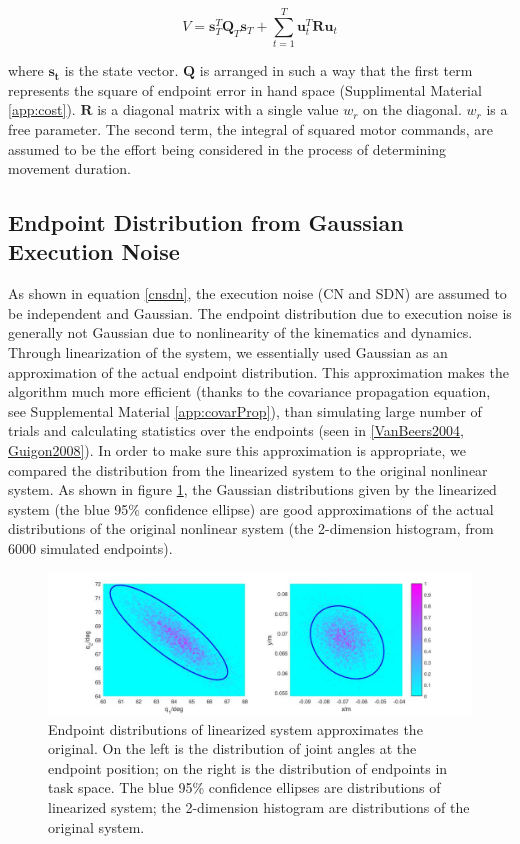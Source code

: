 \begin{equation}\label{eqn:cost}
V = \bm{s}_T^T\bm{Q}_T\bm{s}_T + \sum_{t=1}^T\bm{u}_t^T\bm{Ru}_t
\end{equation}

where $\bm{s_t}$ is the state vector. 
$\bm{Q}$ is arranged in such a way that the first term represents the square of endpoint error in hand space (Supplimental Material \ref{app:cost}). 
$\bm{R}$ is a diagonal matrix with a single value $w_r$ on the diagonal.
$w_r$ is a free parameter.
The second term, the integral of squared motor commands, are assumed to be the effort being considered in the process of determining movement duration. 

\subsection{Endpoint Distribution from Gaussian Execution Noise}

As shown in equation \ref{cnsdn}, the execution noise (CN and SDN) are assumed to be independent and Gaussian. 
The endpoint distribution due to execution noise is generally not Gaussian due to nonlinearity of the kinematics and dynamics. 
Through linearization of the system, we essentially used Gaussian as an approximation of the actual endpoint distribution. 
This approximation makes the algorithm much more efficient (thanks to the covariance propagation equation, see Supplemental Material \ref{app:covarProp}), than simulating large number of trials and calculating statistics over the endpoints (seen in \ref{VanBeers2004, Guigon2008}).
In order to make sure this approximation is appropriate, we compared the distribution from the linearized system to the original nonlinear system. As shown in figure \ref{fig:linearizeddistributionapprox}, the Gaussian distributions given by the linearized system (the blue 95\% confidence ellipse) are good approximations of the actual distributions of the original nonlinear system (the 2-dimension histogram, from 6000 simulated endpoints).

\begin{figure}
	\centering
	\includegraphics[width=\linewidth]{figures/linearizedDistributionApprox}
	\caption[Endpoint distributions of linearized system approximates the original]{Endpoint distributions of linearized system approximates the original. On the left is the distribution of joint angles at the endpoint position; on the right is the distribution of endpoints in task space. The blue 95\% confidence ellipses are distributions of linearized system; the 2-dimension histogram are distributions of the original system.}
	\label{fig:linearizeddistributionapprox}
\end{figure}

